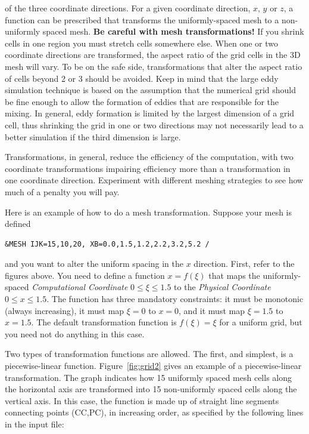 \documentclass[11pt]{book}
\begin{document}
of the three coordinate directions.
For a given coordinate direction, $x$, $y$ or $z$, a function can be
prescribed that transforms the uniformly-spaced mesh to a
non-uniformly spaced mesh. {\bf Be careful with mesh transformations!}  If you shrink cells in one
region you must stretch cells somewhere else. When one
or two coordinate directions are transformed, the aspect ratio of the
grid cells in the 3D mesh will vary. To be on the safe side, transformations
that alter the aspect ratio of cells beyond 2 or 3 should be avoided.
Keep in mind that the large eddy simulation technique is based on the
assumption that the numerical grid should be fine enough to allow the formation
of eddies that are responsible for the mixing. In general, eddy formation
is limited by the largest dimension of a grid cell, thus shrinking the
grid in one or two directions may not necessarily lead to a better
simulation if the third dimension is large.

\begin{warning}
\noindent
Transformations, in general, reduce the efficiency of the computation,
with two coordinate transformations impairing efficiency more
than a transformation in one coordinate direction. Experiment with different meshing
strategies to see how much of a penalty you will pay.
\end{warning}


Here is an example of how to do a mesh transformation. Suppose your mesh is defined

\footnotesize
\begin{verbatim}
&MESH IJK=15,10,20, XB=0.0,1.5,1.2,2.2,3.2,5.2 /
\end{verbatim}
\normalsize

\noindent
and you want to alter the uniform spacing in the $x$ direction.
First, refer to the figures above.
You need to define a function $x = f(\xi)$ that maps the uniformly-spaced
{\em Computational Coordinate} $0 \le \xi \le 1.5$
to the {\em Physical Coordinate} $0 \le x \le 1.5$.
The function has three mandatory constraints: it must be monotonic (always increasing),
it must map $\xi=0$ to $x=0$, and it must map $\xi=1.5$ to $x=1.5$.
The default transformation function is $f(\xi) = \xi$ for a uniform grid, but you need not do
anything in this case.

Two types of transformation functions are allowed. The first, and
simplest, is a piecewise-linear function.
Figure~\ref{fig:grid2} gives an example of a piecewise-linear transformation.
The graph indicates how 15 uniformly spaced mesh cells
along the horizontal axis are transformed into 15 non-uniformly spaced cells along the vertical axis.
In this case, the function is made up of straight line segments
connecting points ({\ct CC},{\ct PC}), in increasing order, as specified by the following lines in the input file:
\end{document}
